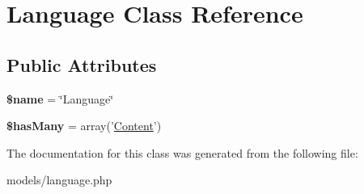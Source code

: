 \hypertarget{class_language}{
\section{\-Language \-Class \-Reference}
\label{class_language}
}
\subsection*{\-Public \-Attributes}
\begin{DoxyCompactItemize}
\item 
\hypertarget{class_language_a1e115ab2ab7218cb4ce6598ff5b0e73b}{
{\bfseries \$name} = \char`\"{}\-Language\char`\"{}}
\label{class_language_a1e115ab2ab7218cb4ce6598ff5b0e73b}

\item 
\hypertarget{class_language_a53d23a9215a4657ec7460021ae512132}{
{\bfseries \$has\-Many} = array('\hyperlink{class_content}{\-Content}')}
\label{class_language_a53d23a9215a4657ec7460021ae512132}

\end{DoxyCompactItemize}


\-The documentation for this class was generated from the following file\-:\begin{DoxyCompactItemize}
\item 
models/language.\-php\end{DoxyCompactItemize}
